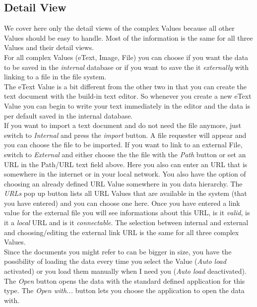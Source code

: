 \documentclass[12pt,a4]{article}
\begin{document}
\subsection{Detail View}
\label{gui_detailview}
\medskip
We cover here only the detail views of the complex Values because all other Values should be easy to handle. Most of the information is the same for all three Values and their detail views. \\
For all complex Values (eText, Image, File) you can choose if you want the data to be saved in the \textit{internal} database or if you want to save the it \textit{externally} with linking to a file in the file system. \\
The eText Value is a bit different from the other two in that you can create the text document with the build-in text editor. So whenever you create a new eText Value you can begin to write your text immediately in the editor and the data is per default saved in the internal database. \\
If you want to import a text document and do not need the file anymore, just switch to \textit{Internal} and press the \textit{import} button. A file requester will appear and you can choose the file to be imported. If you want to link to an external File, switch to \textit{External} and either choose the the file with the \textit{Path} button or set an URL in the Path/URL text field above. Here you also can enter an URL that is somewhere in the internet or in your local network. You also have the option of choosing an already defined URL Value somewhere in you data hierarchy. The \textit{URLs} pop up button lists all URL Values that are available in the system (that you have entered) and you can choose one here. Once you have entered a link value for the external file you will see informations about this URL, is it \textit{valid}, is it a \textit{local} URL and is it \textit{connectable}. The selection between internal and external and choosing/editing the external link URL is the same for all three complex Values. \\
Since the documents you might refer to can be bigger in size, you have the possibility of loading the data every time you select the Value (\textit{Auto load} activated) or you load them manually when I need you (\textit{Auto load} deactivated). \\
The \textit{Open} button opens the data with the standard defined application for this type. The \textit{Open with...} button lets you choose the application to open the data with.
\end{document}

